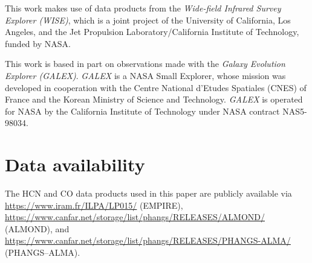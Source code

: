 \documentclass[letter, longauth]{aa} %
\begin{document}
\begin{acknowledgements}
This work makes use of data products from the \textit{Wide-field Infrared Survey Explorer (WISE)}, which is a joint project of the University of California, Los Angeles, and the Jet Propulsion Laboratory/California Institute of Technology, funded by NASA.

This work is based in part on observations made with the \textit{Galaxy Evolution Explorer (GALEX)}. \textit{GALEX} is a NASA Small Explorer, whose mission was developed in cooperation with the Centre National d'Etudes Spatiales (CNES) of France and the Korean Ministry of Science and Technology. \textit{GALEX} is operated for NASA by the California Institute of Technology under NASA contract NAS5-98034.

\end{acknowledgements}

\section*{Data availability}
The HCN and CO data products used in this paper are publicly available via \url{https://www.iram.fr/ILPA/LP015/} (EMPIRE),
\url{https://www.canfar.net/storage/list/phangs/RELEASES/ALMOND/} (ALMOND), and
\url{https://www.canfar.net/storage/list/phangs/RELEASES/PHANGS-ALMA/} (PHANGS--ALMA).





\end{document}
